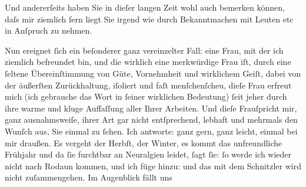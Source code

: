 \pstart
           {\pb}Und andererſeits haben Sie in
               dieſer langen Zeit wohl auch bemerken können, daſs mir ziemlich fern liegt Sie irgend
               wie durch Bekanntmachen mit Leuten etc in Anſpruch zu nehmen.\pend
           
\pstart
           Nun ereignet ſich ein beſonderer ganz vereinzelter Fall: eine Frau, mit der ich ziemlich befreundet bin,
                  {\pb}und die wirklich eine
               merkwürdige Frau iſt, durch
               eine ſeltene Übereinſtimmung von Güte, Vornehmheit und wirklichem Geiſt, dabei von
               der äußerſten Zurückhaltung, iſoliert und faſt menſchenſcheu, dieſe Frau erfreut mich (ich gebrauche das Wort
               in ſeiner wirklichen Bedeutung) ſeit jeher durch ihre warme {\pb}und kluge Auffaſſung aller Ihrer
               Arbeiten. Und dieſe Frau\strikeout{,}{ }ſpricht mir, ganz ausnahmsweiſe, ihrer Art gar
               nicht entſprechend, lebhaft und mehrmals den Wunſch aus, Sie einmal zu ſehen. Ich
               antworte: ganz gern, ganz leicht, einmal bei mir draußen. Es vergeht der Herbſt, der
               Winter, es {\pb}kommt das
               unfreundliche Frühjahr und da ſie furchtbar an Neuralgien leidet, ſagt ſie: ſo werde
               ich wieder nicht nach Rodaun kommen, und ich füge
               hinzu: und das mit dem Schnitzler wird nicht zuſammengehen. Im Augenblick fällt uns
